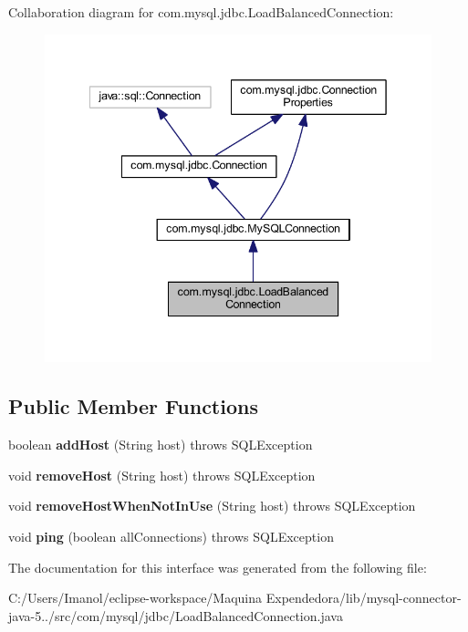 Collaboration diagram for com.\+mysql.\+jdbc.\+Load\+Balanced\+Connection\+:
\nopagebreak
\begin{figure}[H]
\begin{center}
\leavevmode
\includegraphics[width=342pt]{interfacecom_1_1mysql_1_1jdbc_1_1_load_balanced_connection__coll__graph}
\end{center}
\end{figure}
\subsection*{Public Member Functions}
\begin{DoxyCompactItemize}
\item 
\mbox{\label{interfacecom_1_1mysql_1_1jdbc_1_1_load_balanced_connection_a32c2e18107b952bad5aa8d0fbc9a0896}} 
boolean {\bfseries add\+Host} (String host)  throws S\+Q\+L\+Exception
\item 
\mbox{\label{interfacecom_1_1mysql_1_1jdbc_1_1_load_balanced_connection_a43eb4472c1870d386aa273fc99e1eb2a}} 
void {\bfseries remove\+Host} (String host)  throws S\+Q\+L\+Exception
\item 
\mbox{\label{interfacecom_1_1mysql_1_1jdbc_1_1_load_balanced_connection_a46970f4a2be514fb032bfb1891094889}} 
void {\bfseries remove\+Host\+When\+Not\+In\+Use} (String host)  throws S\+Q\+L\+Exception
\item 
\mbox{\label{interfacecom_1_1mysql_1_1jdbc_1_1_load_balanced_connection_a86a5b304e6fa430f9d50ac327c5e7788}} 
void {\bfseries ping} (boolean all\+Connections)  throws S\+Q\+L\+Exception
\end{DoxyCompactItemize}


The documentation for this interface was generated from the following file\+:\begin{DoxyCompactItemize}
\item 
C\+:/\+Users/\+Imanol/eclipse-\/workspace/\+Maquina Expendedora/lib/mysql-\/connector-\/java-\/5../src/com/mysql/jdbc/Load\+Balanced\+Connection.\+java\end{DoxyCompactItemize}
